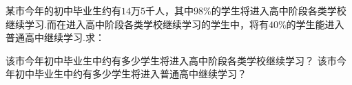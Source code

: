 某市今年的初中毕业生约有$14$万$5$千人，其中$98\%$的学生将进入高中阶段各类学校继续学习.而在进入高中阶段各类学校继续学习的学生中，将有$40\%$的学生能进入普通高中继续学习.求：
\begin{subquestions}
    \subquestion 该市今年初中毕业生中约有多少学生将进入高中阶段各类学校继续学习？
    \subquestion 该市今年初中毕业生中约有多少学生将进入普通高中继续学习？
\end{subquestions}